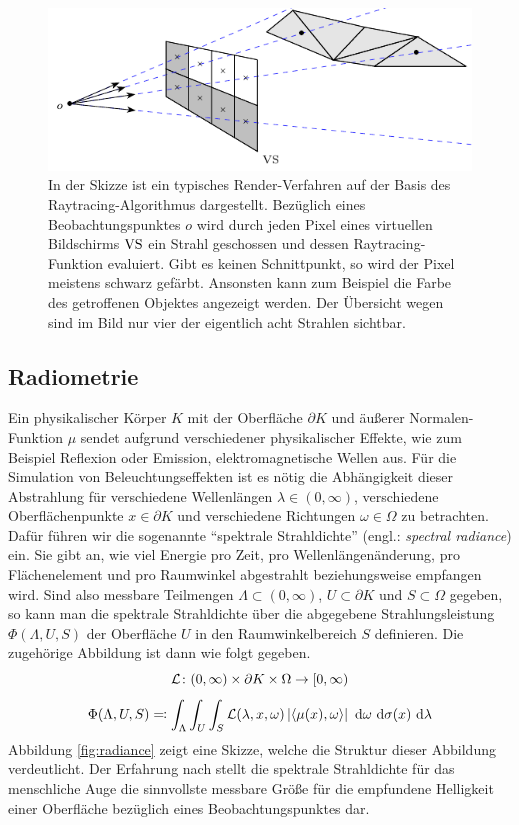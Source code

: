		\begin{figure}
			\center
			\includegraphics{gg_fig/ray_tracing_2.pdf}
			\caption{In der Skizze ist ein typisches Render-Verfahren auf der Basis des Raytracing-Algorithmus dargestellt. Bezüglich eines Beobachtungspunktes $o$ wird durch jeden Pixel eines virtuellen Bildschirms $\mathrm{VS}$ ein Strahl geschossen und dessen Raytracing-Funktion evaluiert. Gibt es keinen Schnittpunkt, so wird der Pixel meistens schwarz gefärbt. Ansonsten kann zum Beispiel die Farbe des getroffenen Objektes angezeigt werden. Der Übersicht wegen sind im Bild nur vier der eigentlich acht Strahlen sichtbar.}
			\label{fig:ray_tracing-2}
		\end{figure}


	\subsection{Radiometrie} %
	\label{sub:radiometrie}

		Ein physikalischer Körper $K$ mit der Oberfläche $\partial K$ und äußerer Normalen-Funktion $\mu$ sendet aufgrund verschiedener physikalischer Effekte, wie zum Beispiel Reflexion oder Emission, elektromagnetische Wellen aus.
		Für die Simulation von Beleuchtungseffekten ist es nötig die Abhängigkeit dieser Abstrahlung für verschiedene Wellenlängen $\lambda\in(0,\infty)$, verschiedene Oberflächenpunkte $x\in\partial K$ und verschiedene Richtungen $\omega\in\Omega$ zu betrachten.
		Dafür führen wir die sogenannte \enquote{spektrale Strahldichte} (engl.: \textit{spectral radiance}) ein.
		Sie gibt an, wie viel Energie pro Zeit, pro Wellenlängenänderung, pro Flächenelement und pro Raumwinkel abgestrahlt beziehungsweise empfangen wird.
		Sind also messbare Teilmengen $\Lambda\subset (0,\infty)$, $U\subset \partial K$ und $S\subset\Omega$ gegeben, so kann man die spektrale Strahldichte über die abgegebene Strahlungsleistung $\Phi(\Lambda,U,S)$ der Oberfläche $U$ in den Raumwinkelbereich $S$ definieren.
		Die zugehörige Abbildung ist dann wie folgt gegeben.
		\[
			\mathcal{L}\colon(0,\infty)\times\partial K\times \Omega\to[0,\infty)
		\]
		\[
			\Phi(\Lambda,U,S) \eqqcolon \int_{\Lambda}^{}  \int_{U}^{}  \int_{S}^{}  \mathcal{L}(\lambda,x,\omega)\left\vert \left\langle \mu(x),\omega \right\rangle \right\vert \ \mathrm{d} \omega \ \mathrm{d} \sigma(x) \ \mathrm{d} \lambda
		\]
		Abbildung \ref{fig:radiance} zeigt eine Skizze, welche die Struktur dieser Abbildung verdeutlicht.
		Der Erfahrung nach stellt die spektrale Strahldichte für das menschliche Auge die sinnvollste messbare Größe für die empfundene Helligkeit einer Oberfläche bezüglich eines Beobachtungspunktes dar.

